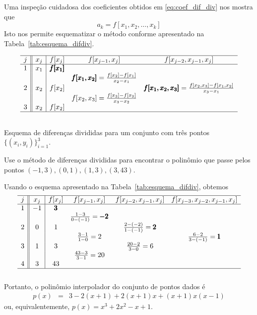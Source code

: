 Uma inspeção cuidadosa dos coeficientes obtidos em \eqref{eq:coef_dif_div} nos mostra que
\begin{equation*}
 a_k=f[x_1,x_2,\ldots,x_k] 
\end{equation*}
Isto nos permite esquematizar o método conforme apresentado na Tabela~\ref{tab:esquema_difdiv}. 

\begin{table}
  \centering
$$
\begin{array}{c||c|ccc}\hline
j &x_j&f[x_j]&f[x_{j-1},x_j]&f[x_{j-2},x_{j-1},x_j]\\\hline
1 & x_1 & \pmb{f[x_1]}&&\\
&&&\pmb{f[x_1,x_2]}=\frac{f[x_2]-f[x_1]}{x_2-x_1}&\\
2 & x_2&f[x_2]&&\pmb{f[x_1,x_2,x_3]}=\frac{f[x_2,x_3]-f[x_1,x_2]}{x_3-x_1}\\
&&&f[x_2,x_3]=\frac{f[x_3]-f[x_2]}{x_3-x_2}&\\
3 & x_2&f[x_2]&&\\\hline
\multicolumn{5}{c}{}
\end{array}
$$
  \caption{Esquema de diferenças divididas para um conjunto com três pontos $\{(x_i, y_i)\}_{i=1}^3$.}
  \label{tab:esquema_difdiv}
\end{table}

\begin{ex}
Use o método de diferenças divididas para encontrar o polinômio que passe pelos pontos $(-1,3),(0,1),(1,3),(3,43)$.
\end{ex}
\begin{sol}
Usando o esquema apresentado na Tabela~\ref{tab:esquema_difdiv}, obtemos
\begin{equation*}
\begin{array}{c||c|cccc}\hline
 j&x_j&f[x_j]&f[x_{j-1},x_j]&f[x_{j-2},x_{j-1},x_j]&f[x_{j-3},x_{j-2},x_{j-1},x_j]\\\hline
1& -1 & \pmb{3}&&&\\
&&&\frac{1-3}{0-(-1)}=\pmb{-2}&&\\
2&0&1&&\frac{2-(-2)}{1-(-1)}=\pmb{2}&\\
&&&\frac{3-1}{1-0}=2&&\frac{6-2}{3-(-1)}=\pmb{1}\\
3&1&3&&\frac{20-2}{3-0}=6&\\
&&&\frac{43-3}{3-1}=20&&\\
4&3&43&&&\\\hline
\multicolumn{5}{c}{}
\end{array}  
\end{equation*}
Portanto, o polinômio interpolador do conjunto de pontos dados é
\begin{eqnarray*}
p(x)&=&3-2(x+1)+2(x+1)x+(x+1)x(x-1)
\end{eqnarray*}
ou, equivalentemente, $p(x) = x^3+2x^2-x+1$.
\end{sol}


